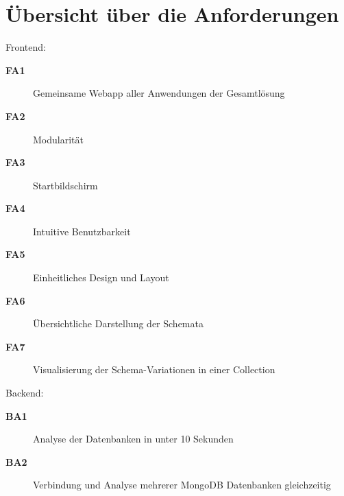 \cleardoublepage

\section{Übersicht über die Anforderungen}
\label{sec:anf_uebersicht}

Frontend:

\begin{description}
    \item[\textbf{FA1}\label{itm:fa1}] Gemeinsame Webapp aller Anwendungen der Gesamtlösung
    \item[\textbf{FA2}\label{itm:fa2}] Modularität
    \item[\textbf{FA3}\label{itm:fa3}] Startbildschirm
    \item[\textbf{FA4}\label{itm:fa4}] Intuitive Benutzbarkeit
    \item[\textbf{FA5}\label{itm:fa5}] Einheitliches Design und Layout
    \item[\textbf{FA6}\label{itm:fa6}] Übersichtliche Darstellung der Schemata
    \item[\textbf{FA7}\label{itm:fa7}] Visualisierung der Schema-Variationen in einer Collection
\end{description}

Backend:

\begin{description}
    \item[\textbf{BA1}\label{itm:ba1}] Analyse der Datenbanken in unter 10 Sekunden
    \item[\textbf{BA2}\label{itm:ba2}] Verbindung und Analyse mehrerer MongoDB Datenbanken gleichzeitig
\end{description}

